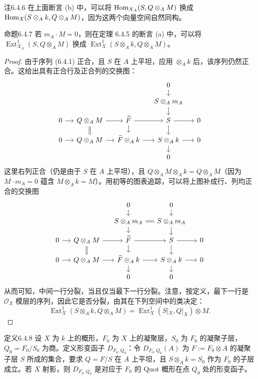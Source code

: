 \begin{origstatement}{注}{6.4.6}\label{ch06:6.4.6}
在上面断言 (b) 中，可以将 $\operatorname{Hom}_{X_A}(S,Q\otimes_A M)$ 换成 $\operatorname{Hom}_X(S\otimes_A k,Q\otimes_A M)$，因为这两个向量空间自然同构。
\end{origstatement}
\begin{origstatement}{命题}{6.4.7}\label{ch06:6.4.7}
若 $m_A\cdot M=0$，则在定理 6.4.5 的断言 (a) 中，可以将 $\operatorname{Ext}^1_{X_A}(S,Q\otimes_A M)$ 换成 $\operatorname{Ext}^1_X(S\otimes_A k,Q\otimes_A M)$。
\end{origstatement}
\begin{proof}
由于序列 (6.4.1) 正合，且 $S$ 在 $A$ 上平坦，应用 $\otimes_A k$ 后，该序列仍然正合。这给出具有正合行及正合列的交换图：
\[
\begin{tikzcd}[column sep=small,row sep=small]
&&&0\arrow[d]&\\
&&&S\otimes_A m_A\arrow[d]&\\
0\arrow[r]&Q\otimes_A M\arrow[r]\arrow[d,equal]&\widetilde F\arrow[r]\arrow[d]&S\arrow[r]\arrow[d]&0\\
0\arrow[r]&Q\otimes_A M\arrow[r]&\widetilde F\otimes_A k\arrow[r]&S\otimes_A k\arrow[r]\arrow[d]&0\\
&&&0&
\end{tikzcd}
\]
这里右列正合（仍是由于 $S$ 在 $A$ 上平坦），且 $Q\otimes_A M\otimes_A k=Q\otimes_A M$（因为 $M\cdot m_A=0$ 蕴含 $M\otimes_A k=M$）。用初等的图表追踪，可以将上图补成行、列均正合的交换图
\[
\begin{tikzcd}[column sep=small,row sep=small]
&&0\arrow[d]&0\arrow[d]&\\
&&S\otimes_A m_A\arrow[r,equal]\arrow[d]&S\otimes_A m_A\arrow[d]&\\
0\arrow[r]&Q\otimes_A M\arrow[r]\arrow[d,equal]&\widetilde F\arrow[r]\arrow[d]&S\arrow[r]\arrow[d]&0\\
0\arrow[r]&Q\otimes_A M\arrow[r]&\widetilde F\otimes_A k\arrow[r]\arrow[d]&S\otimes_A k\arrow[r]\arrow[d]&0\\
&&0&0&
\end{tikzcd}
\]
从而可知，中间一行分裂，当且仅当最下一行分裂。注意，按定义，最下一行是 $\mathcal O_X$ 模层的序列，因此它是否分裂，由其在下列空间中的类决定：
\[
\operatorname{Ext}^1_X(S\otimes_A k,Q\otimes_A M)
=\operatorname{Ext}^1_X(S|_X,Q|_X)\otimes M.
\]
\end{proof}
\begin{origstatement}{定义}{6.4.8}\label{ch06:6.4.8}
设 $X$ 为 $k$ 上的概形，$F_0$ 为 $X$ 上的凝聚层，$S_0$ 为 $F_0$ 的凝聚子层，$Q_0=F_0/S_0$ 为商。定义形变函子 $D_{F_0,Q_0}$：令 $D_{F_0,Q_0}(A)$ 为 $F:=F_0\otimes A$ 的凝聚子层 $S$ 所成的集合，要求 $Q=F/S$ 在 $A$ 上平坦，且 $S\otimes_A k=S_0$ 作为 $F_0$ 的子层成立。若 $X$ 射影，则 $D_{F_0,Q_0}$ 是对应于 $F_0$ 的 Quot 概形在点 $Q_0$ 处的形变函子。
\end{origstatement}
